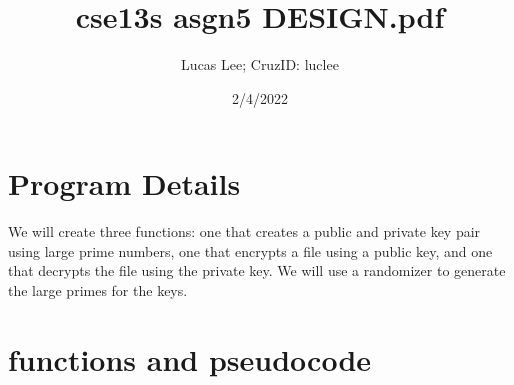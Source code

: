 \documentclass[11pt]{article}
\title{cse13s asgn5 DESIGN.pdf}
\author{Lucas Lee; CruzID: luclee}
\date{2/4/2022}
\begin{document}
\maketitle
\section{Program Details}\label{ss:details}
We will create three functions: one that creates a public and private key pair using large prime numbers, one that encrypts a file using a public key, and one that decrypts the file using the private key. We will use a randomizer to generate the large primes for the keys.

\section{functions and pseudocode}\label{ss:functions}
\end{document}
